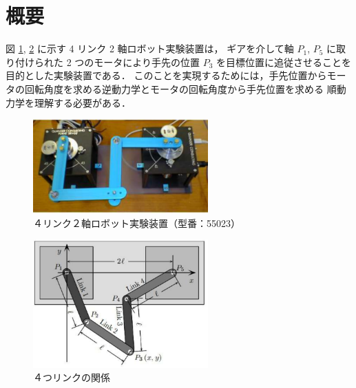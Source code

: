 \section{概要}

図 \ref{fig:robot1}, \ref{fig:robot2} に示す 4 リンク 2 軸ロボット実験装置は，
ギアを介して軸 $P_1$, $P_5$ に取り付けられた 2 つのモータにより手先の位置 $P_3$ を目標位置に追従させることを
目的とした実験装置である．
このことを実現するためには，手先位置からモータの回転角度を求める逆動力学とモータの回転角度から手先位置を求める
順動力学を理解する必要がある．

\begin{figure}[htbp]
    \centering
    \includegraphics[width=0.6\textwidth]{figure/robot_fig1.pdf}
    \caption{４リンク２軸ロボット実験装置（型番：55023）}
    \label{fig:robot1}
\end{figure}

\begin{figure}[htbp]
    \centering
    \includegraphics[width=0.6\textwidth]{figure/robot_fig2.pdf}
    \caption{４つリンクの関係}
    \label{fig:robot2}
\end{figure}
